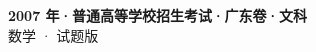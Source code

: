 \documentclass[zihao=-4, a4paper]{ctexart}
\begin{document}
\begin{center}
  {\Large\bfseries 2007 年·普通高等学校招生考试·广东卷·文科}\\[4pt]
  {\large 数学 · 试题版}
\end{center}
\medskip
{}

\end{document}
